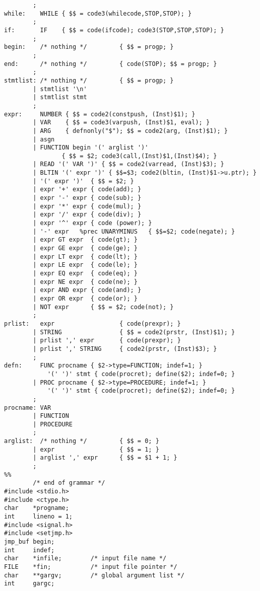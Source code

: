 \begin{verbatim}
        ;
while:    WHILE { $$ = code3(whilecode,STOP,STOP); }
        ;
if:       IF    { $$ = code(ifcode); code3(STOP,STOP,STOP); }
        ;
begin:    /* nothing */         { $$ = progp; }
        ;
end:      /* nothing */         { code(STOP); $$ = progp; }
        ;
stmtlist: /* nothing */         { $$ = progp; }
        | stmtlist '\n'
        | stmtlist stmt
        ;
expr:     NUMBER { $$ = code2(constpush, (Inst)$1); }
        | VAR    { $$ = code3(varpush, (Inst)$1, eval); }
        | ARG    { defnonly("$"); $$ = code2(arg, (Inst)$1); }
        | asgn
        | FUNCTION begin '(' arglist ')'
                { $$ = $2; code3(call,(Inst)$1,(Inst)$4); }
        | READ '(' VAR ')' { $$ = code2(varread, (Inst)$3); }
        | BLTIN '(' expr ')' { $$=$3; code2(bltin, (Inst)$1->u.ptr); }
        | '(' expr ')'  { $$ = $2; }
        | expr '+' expr { code(add); }
        | expr '-' expr { code(sub); }
        | expr '*' expr { code(mul); }
        | expr '/' expr { code(div); }
        | expr '^' expr { code (power); }
        | '-' expr   %prec UNARYMINUS   { $$=$2; code(negate); }
        | expr GT expr  { code(gt); }
        | expr GE expr  { code(ge); }
        | expr LT expr  { code(lt); }
        | expr LE expr  { code(le); }
        | expr EQ expr  { code(eq); }
        | expr NE expr  { code(ne); }
        | expr AND expr { code(and); }
        | expr OR expr  { code(or); }
        | NOT expr      { $$ = $2; code(not); }
        ;
prlist:   expr                  { code(prexpr); }
        | STRING                { $$ = code2(prstr, (Inst)$1); }
        | prlist ',' expr       { code(prexpr); }
        | prlist ',' STRING     { code2(prstr, (Inst)$3); }
        ;
defn:     FUNC procname { $2->type=FUNCTION; indef=1; }
            '(' ')' stmt { code(procret); define($2); indef=0; }
        | PROC procname { $2->type=PROCEDURE; indef=1; }
            '(' ')' stmt { code(procret); define($2); indef=0; }
        ;
procname: VAR
        | FUNCTION
        | PROCEDURE
        ;
arglist:  /* nothing */         { $$ = 0; }
        | expr                  { $$ = 1; }
        | arglist ',' expr      { $$ = $1 + 1; }
        ;
%%
        /* end of grammar */
#include <stdio.h>
#include <ctype.h>
char    *progname;
int     lineno = 1;
#include <signal.h>
#include <setjmp.h>
jmp_buf begin;
int     indef;
char    *infile;        /* input file name */
FILE    *fin;           /* input file pointer */
char    **gargv;        /* global argument list */
int     gargc;


\end{verbatim}

